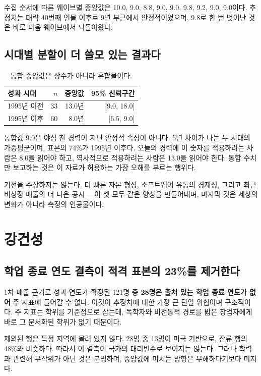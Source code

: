 \documentclass[11pt]{article}
\begin{document}
수집 순서에 따른 웨이브별 중앙값은
10.0, 9.0, 8.8, 9.0, 9.0, 9.8, 9.2, 9.0, 9.0이다.
추정치는 대략 40번째 인물 이후로 9년 부근에서 안정적이었으며, 9.8로 한 번 벗어난 것은
바로 다음 웨이브에서 되돌아왔다.

\subsection{시대별 분할이 더 쓸모 있는 결과다}

\begin{table}[h]
\centering
\begin{tabular}{lrrr}
\toprule
성과 시대 & $n$ & 중앙값 & 95\% 신뢰구간 \\
\midrule
1995년 이전 & 33 & 13.0년 & [9.0, 18.0] \\
1995년 이후 & 60 &  8.0년 & [6.5, 9.0] \\
\bottomrule
\end{tabular}
\caption{통합 중앙값은 상수가 아니라 혼합물이다.}
\end{table}

통합값 9.0은 야심 찬 경력이 지닌 안정적 속성이 아니다. 5년 차이가 나는 두 시대의
가중평균이며, 표본의 74\%가 1995년 이후다. 오늘의 경력에 이 숫자를 적용하려는 사람은
8.0을 읽어야 하고, 역사적으로 적용하려는 사람은 13.0을 읽어야 한다. 통합 수치만
보고하는 것은 이 자료가 허용하는 가장 오해를 부르는 행위다.

기전을 주장하지는 않는다. 더 빠른 자본 형성, 소프트웨어 유통의 경제성, 그리고 최근
비상장 매출의 더 나은 공시\,---\,이 셋 모두 같은 양상을 만들어내며, 마지막 것은 세상의
변화가 아니라 측정의 인공물이다.

\section{강건성}
\label{sec:robust}

\subsection{학업 종료 연도 결측이 적격 표본의 23\%를 제거한다}

1차 매출 근거로 성과 연도가 확정된 121명 중 \textbf{28명은 출처 있는 학업 종료
연도가 없어} 주 지표에 들어갈 수 없다. 이것이 추정치에 대한 가장 큰 단일 위협이며
구조적이다. 주 지표는 학위를 기준점으로 삼는데, 독학자와 비전통적 경로를 밟은 창업자에게
바로 그 문서화된 학위가 없기 때문이다.

제외된 행은 특정 지역에 몰려 있지 않다. 28명 중 13명이 미국 기반으로, 잔류 행의
48\%와 비슷하다. 따라서 이 결측이 국가의 대리변수로 보이지는 않는다. 그러나 학력과
관련해 무작위가 아닌 것은 분명하며, 중앙값에 미치는 방향은 무해하다기보다 미지다.
\end{document}
